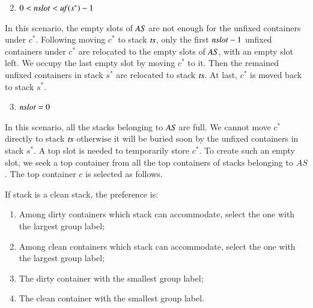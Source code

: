 \documentclass[review,3p,times,authoryear,12pt]{elsarticle}
\begin{document}
\begin{enumerate}
\setcounter{enumi}{1}
\item $0<\id{nslot}< \id{uf}(s^*)-1$
\end{enumerate}
In this scenario, the empty slots of $\id{AS}$ are not enough for the unfixed containers under $c^*$. Following moving $c^*$ to stack $\id{ts}$, only the first $\id{nslot}-1$ unfixed containers under $c^*$ are relocated to the empty slots of $\id{AS}$, with an empty slot left. We occupy the last empty slot by moving $c^*$ to it. Then the remained unfixed containers in stack $s^*$ are relocated to stack $\id{ts}$. At last, $c^*$ is moved back to stack $s^*$.
\begin{enumerate}
\setcounter{enumi}{2}
\item $\id{nslot}=0$
\end{enumerate}
In this scenario, all the stacks belonging to $\id{AS}$ are full. We cannot move $c^*$ directly to stack $\id{ts}$ otherwise it will be buried soon by the unfixed containers in stack $s^*$. A top slot is needed to temporarily store $c^*$. To create such an empty slot, we seek a top container from all the top containers of stacks belonging to $AS$. The top container $c$ is selected as follows.

If stack  is a clean stack, the preference is:
\begin{enumerate}[1.]
\item Among dirty containers which stack  can accommodate, select the one with the largest group label;
\item Among clean containers which stack  can accommodate, select the one with the largest group label;
\item The dirty container with the smallest group label;
\item The clean container with the smallest group label.
\end{enumerate}
\end{document}
